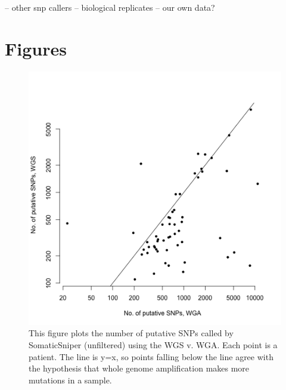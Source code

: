 \documentclass[11pt]{article} %
\begin{document}
-- other snp callers
-- biological replicates
-- our own data?



\section{Figures}

\begin{figure}
\includegraphics[scale=1.0]{C282_v_C484.png}
\caption{This figure plots the number of putative SNPs called by SomaticSniper (unfiltered) using the WGS v. WGA. Each point is a patient. The line is y=x, so points falling below the line agree with the hypothesis that whole genome amplification makes more mutations in a sample.}
\end{figure}
\end{document}
